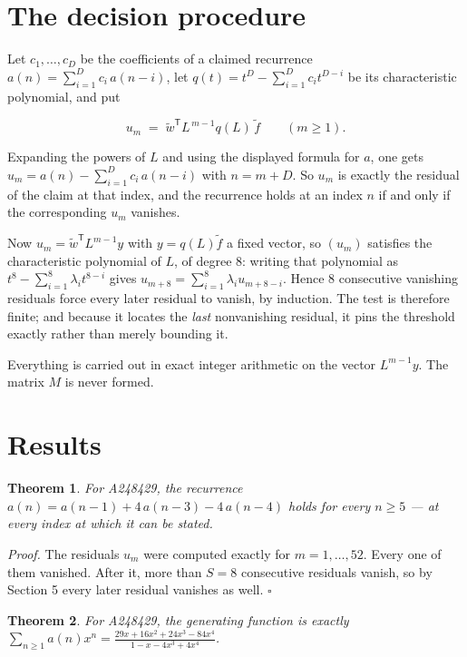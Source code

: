 \documentclass[11pt]{article}
\newtheorem{theorem}{Theorem}
\theoremstyle{definition}
\begin{document}
\section{The decision procedure}

Let $c_1,\dots,c_D$ be the coefficients of a claimed recurrence $a(n) = \sum_{i=1}^{D} c_i\,a(n-i)$, let $q(t) = t^{D} - \sum_{i=1}^{D} c_i t^{D-i}$ be its characteristic polynomial, and put

\[u_m \;=\; \tilde w^{\mathsf T} L^{\,m-1} q(L)\,\tilde f \qquad (m \ge 1).\]

Expanding the powers of $L$ and using the displayed formula for $a$, one gets $u_m = a(n) - \sum_{i=1}^{D} c_i\,a(n-i)$ with $n = m + D$. So $u_m$ is exactly the residual of the claim at that index, and the recurrence holds at an index $n$ if and only if the corresponding $u_m$ vanishes.

Now $u_m = \tilde w^{\mathsf T} L^{m-1} y$ with $y = q(L)\tilde f$ a fixed vector, so $(u_m)$ satisfies the characteristic polynomial of $L$, of degree $8$: writing that polynomial as $t^{8} - \sum_{i=1}^{8} \lambda_i t^{8-i}$ gives $u_{m+8} = \sum_{i=1}^{8} \lambda_i u_{m+8-i}$. Hence $8$ consecutive vanishing residuals force every later residual to vanish, by induction. The test is therefore finite; and because it locates the {\itshape last} nonvanishing residual, it pins the threshold exactly rather than merely bounding it.

Everything is carried out in exact integer arithmetic on the vector $L^{m-1}y$. The matrix $M$ is never formed.

\section{Results}

\begin{theorem} For A248429, the recurrence $a(n) = a(n-1) + 4\,a(n-3) - 4\,a(n-4)$ holds for every $n \ge 5$ --- at every index at which it can be stated.\end{theorem}

{\itshape Proof.} The residuals $u_m$ were computed exactly for $m = 1,\dots,52$. Every one of them vanished. After it, more than $S = 8$ consecutive residuals vanish, so by Section 5 every later residual vanishes as well. $\square$

\begin{theorem} For A248429, the generating function is exactly $\sum_{n\ge 1} a(n)x^n = \frac{29x + 16x^{2} + 24x^{3} - 84x^{4}}{1 - x - 4x^{3} + 4x^{4}}$.\end{theorem}
\end{document}
